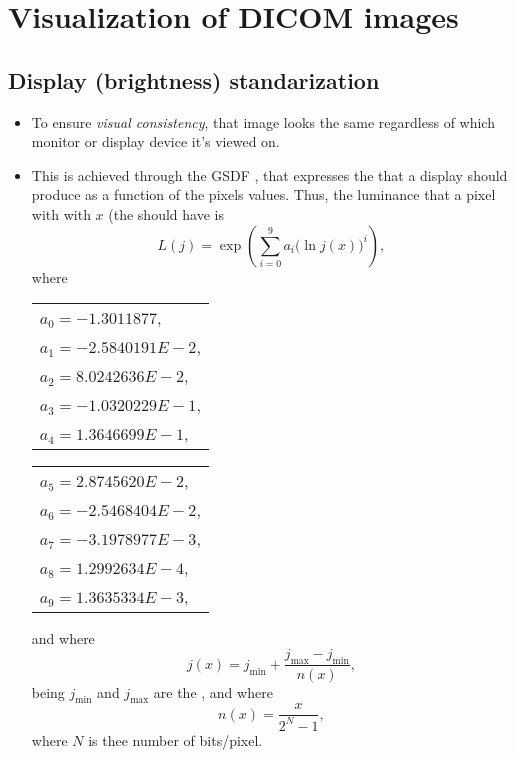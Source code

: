 \chapter{Visualization of \gls{DICOM} images}

\section{Display (brightness) standarization}
\begin{itemize}
\item To ensure \emph{visual consistency}, that image looks the same
  regardless of which monitor or display device it's viewed on.
\item This is achieved through the \gls{GSDF} \cite{DICOM_GSDF}, that
  expresses the  that a display
  should produce as a function of the pixels values. Thus, the
  luminance that a pixel with with  $x$ (the should have is
  \begin{equation}
    L(j) = \exp\left(\sum_{i=0}^{9}a_i\big(\ln j(x)\big)^i\right),
  \end{equation}
  where
  \begin{center}
  \begin{tabular}{l}
    $a_0 = -1.3011877$, \\
    $a_1 = -2.5840191E-2$, \\
    $a_2 = 8.0242636E-2$, \\
    $a_3 = -1.0320229E-1$, \\
    $a_4 = 1.3646699E-1$, \\
  \end{tabular}
  \begin{tabular}{l}
    $a_5 = 2.8745620E-2$, \\
    $a_6 = -2.5468404E-2$,\\
    $a_7 = -3.1978977E-3$, \\
    $a_8 = 1.2992634E-4$, \\
    $a_9 = 1.3635334E-3$,
  \end{tabular}
  \end{center}
  and where
  \begin{equation}
    j(x) = j_{\text{min}} + \frac{j_{\text{max}} - j_{\text{min}}}{n(x)},
  \end{equation}
  being $j_{\text{min}}$ and $j_{\text{max}}$ are the , and where
  \begin{equation}
    n(x) = \frac{x}{2^N-1},
  \end{equation}
  where $N$ is thee number of bits/pixel.
\end{itemize}

